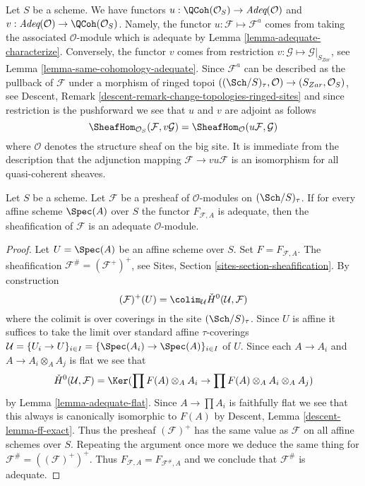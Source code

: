 \begin{remark}
\label{remark-compare}
Let $S$ be a scheme. We have functors
$u : \QCoh(\mathcal{O}_S) \to \textit{Adeq}(\mathcal{O})$
and
$v : \textit{Adeq}(\mathcal{O}) \to \QCoh(\mathcal{O}_S)$.
Namely, the functor $u : \mathcal{F} \mapsto \mathcal{F}^a$
comes from taking the associated $\mathcal{O}$-module which is
adequate by
Lemma \ref{lemma-adequate-characterize}.
Conversely, the functor $v$ comes from restriction
$v : \mathcal{G} \mapsto \mathcal{G}|_{S_{Zar}}$, see
Lemma \ref{lemma-same-cohomology-adequate}.
Since $\mathcal{F}^a$ can be described as the pullback of
$\mathcal{F}$ under a morphism of ringed topoi
$((\Sch/S)_\tau, \mathcal{O}) \to (S_{Zar}, \mathcal{O}_S)$, see
Descent, Remark \ref{descent-remark-change-topologies-ringed-sites}
and since restriction is the pushforward we see that $u$ and $v$
are adjoint as follows
$$
\SheafHom_{\mathcal{O}_S}(\mathcal{F}, v\mathcal{G})
=
\SheafHom_\mathcal{O}(u\mathcal{F}, \mathcal{G})
$$
where $\mathcal{O}$ denotes the structure sheaf on the big site.
It is immediate from the description that the adjunction mapping
$\mathcal{F} \to vu\mathcal{F}$ is an isomorphism for all quasi-coherent
sheaves.
\end{remark}

\begin{lemma}
\label{lemma-sheafification-adequate}
Let $S$ be a scheme. Let $\mathcal{F}$ be a presheaf of $\mathcal{O}$-modules
on $(\Sch/S)_\tau$. If for every affine scheme
$\Spec(A)$ over $S$ the functor $F_{\mathcal{F}, A}$ is
adequate, then the sheafification of $\mathcal{F}$ is an adequate
$\mathcal{O}$-module.
\end{lemma}

\begin{proof}
Let $U = \Spec(A)$ be an affine scheme over $S$.
Set $F = F_{\mathcal{F}, A}$.
The sheafification $\mathcal{F}^\# = (\mathcal{F}^+)^+$, see
Sites, Section \ref{sites-section-sheafification}.
By construction
$$
(\mathcal{F})^+(U) =
\colim_\mathcal{U} \check{H}^0(\mathcal{U}, \mathcal{F})
$$
where the colimit is over coverings in the site $(\Sch/S)_\tau$.
Since $U$ is affine it suffices to take the limit over standard
affine $\tau$-coverings
$\mathcal{U} = \{U_i \to U\}_{i \in I} =
\{\Spec(A_i) \to \Spec(A)\}_{i \in I}$ of $U$.
Since each $A \to A_i$ and $A \to A_i \otimes_A A_j$ is flat we see that
$$
\check{H}^0(\mathcal{U}, \mathcal{F}) =
\Ker(\prod F(A) \otimes_A A_i \to \prod F(A) \otimes_A A_i \otimes_A A_j)
$$
by
Lemma \ref{lemma-adequate-flat}.
Since $A \to \prod A_i$ is faithfully flat we see that this always
is canonically isomorphic to $F(A)$ by
Descent, Lemma \ref{descent-lemma-ff-exact}.
Thus the presheaf $(\mathcal{F})^+$ has the same value as
$\mathcal{F}$ on all affine schemes over $S$. Repeating the argument
once more we deduce the same thing for $\mathcal{F}^\# = ((\mathcal{F})^+)^+$.
Thus $F_{\mathcal{F}, A} = F_{\mathcal{F}^\#, A}$ and we conclude
that $\mathcal{F}^\#$ is adequate.
\end{proof}

